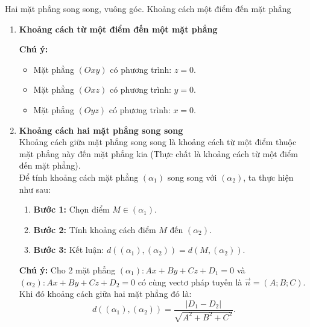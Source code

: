 \begin{dang}{Hai mặt phẳng song song, vuông góc. Khoảng cách một điểm đến mặt phẳng}
\begin{enumerate}[label=\bf\arabic*.]
		\item \textbf{Khoảng cách từ một điểm đến một mặt phẳng}
		\begin{note}
			\textbf{Chú ý:}
			\begin{itemize}
				\item Mặt phẳng $(O x y)$ có phương trình: $z=0$.
				\item Mặt phẳng $(O x z)$ có phương trình: $y=0$.
				\item Mặt phẳng $(O y z)$ có phương trình: $x=0$.
			\end{itemize}
		\end{note}
		\item \textbf{Khoảng cách hai mặt phẳng song song}\\
		Khoảng cách giữa mặt phẳng song song là khoảng cách từ một điểm thuộc mặt phẳng này đến mặt phẳng kia (Thực chất là khoảng cách từ một điểm đến mặt phẳng).\\
		Để tính khoảng cách mặt phẳng $\left(\alpha_1\right)$ song song với $\left(\alpha_2\right)$, ta thực hiện như sau:
		\begin{enumerate}
			\item[] \textbf{Bước 1:} Chọn điểm $M \in\left(\alpha_1\right)$.
			\item[] \textbf{Bước 2:} Tính khoảng cách điểm $M$ đến $\left(\alpha_2\right)$.
			\item[] \textbf{Bước 3:} Kết luận: $d\left(\left(\alpha_1\right),\left(\alpha_2\right)\right)=d\left(M,\left(\alpha_2\right)\right)$.
		\end{enumerate}
		\begin{note}
			\textbf{Chú ý:}
			Cho 2 mặt phẳng $\left(\alpha_1\right)\colon A x+B y+C z+D_1=0$ và $\left(\alpha_2\right)\colon A x+B y+C z+D_2=0$ có cùng vectơ pháp tuyến là $\overrightarrow{n}=(A; B; C)$. Khi đó khoảng cách giữa hai mặt phẳng đó là: $$d\left(\left(\alpha_1\right),(\alpha_2)\right)=\dfrac{\left|D_1-D_2\right|}{\sqrt{A^2+B^2+C^2}}.$$ 
		\end{note}
	\end{enumerate}
\end{dang}
